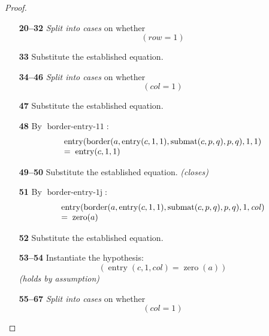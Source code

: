 \documentclass[11pt]{article}
\theoremstyle{plain}
\begin{document}
\begin{proof}
\begin{itemize}[leftmargin=2.8em, itemsep=4pt, parsep=1pt]
  \item[\textbf{20--32}] \emph{Split into cases} on whether
\begin{equation*}
(\mathit{row} = 1)
\end{equation*}

  \item[\textbf{33}] Substitute the established equation.
  \item[\textbf{34--46}] \emph{Split into cases} on whether
\begin{equation*}
(\mathit{col} = 1)
\end{equation*}

  \item[\textbf{47}] Substitute the established equation.
  \item[\textbf{48}] By $\operatorname{border\text{-}entry\text{-}11}$:
\begin{equation*}
\begin{array}{@{}l@{}} \operatorname{entry}(\operatorname{border}(a, \operatorname{entry}(c, 1, 1), \operatorname{submat}(c, p, q), p, q), 1, 1) \\ =\; \operatorname{entry}(c, 1, 1) \end{array}
\end{equation*}

  \item[\textbf{49--50}] Substitute the established equation.  \emph{(closes)}
  \item[\textbf{51}] By $\operatorname{border\text{-}entry\text{-}1j}$:
\begin{equation*}
\begin{array}{@{}l@{}} \operatorname{entry}(\operatorname{border}(a, \operatorname{entry}(c, 1, 1), \operatorname{submat}(c, p, q), p, q), 1, \mathit{col}) \\ =\; \operatorname{zero}(a) \end{array}
\end{equation*}

  \item[\textbf{52}] Substitute the established equation.
  \item[\textbf{53--54}] Instantiate the hypothesis:
\begin{equation*}
(\operatorname{entry}(c, 1, \mathit{col}) = \operatorname{zero}(a))
\end{equation*}
  \emph{(holds by assumption)}
  \item[\textbf{55--67}] \emph{Split into cases} on whether
\begin{equation*}
(\mathit{col} = 1)
\end{equation*}


\end{itemize}
\end{proof}
\end{document}
